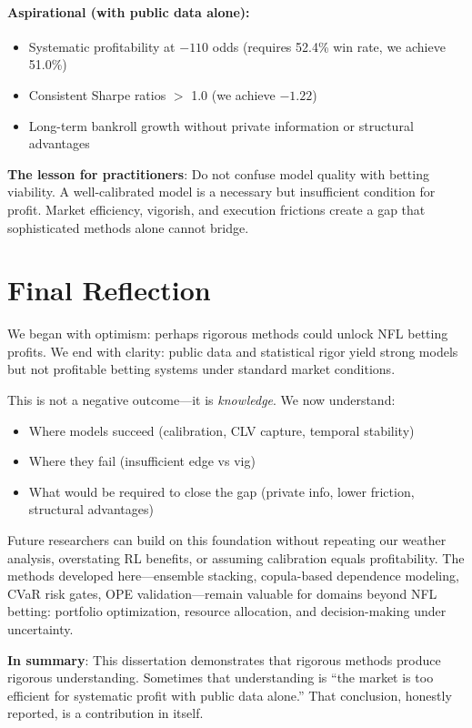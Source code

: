 \paragraph{Aspirational (with public data alone):}
\begin{itemize}
  \item Systematic profitability at $-110$ odds (requires 52.4\% win rate, we achieve 51.0\%)
  \item Consistent Sharpe ratios $>$ 1.0 (we achieve $-1.22$)
  \item Long-term bankroll growth without private information or structural advantages
\end{itemize}

\textbf{The lesson for practitioners}: Do not confuse model quality with betting viability. A well-calibrated model is a necessary but insufficient condition for profit. Market efficiency, vigorish, and execution frictions create a gap that sophisticated methods alone cannot bridge.

\section{Final Reflection}

We began with optimism: perhaps rigorous methods could unlock NFL betting profits. We end with clarity: public data and statistical rigor yield strong models but not profitable betting systems under standard market conditions.

This is not a negative outcome—it is \textit{knowledge}. We now understand:
\begin{itemize}
  \item Where models succeed (calibration, CLV capture, temporal stability)
  \item Where they fail (insufficient edge vs vig)
  \item What would be required to close the gap (private info, lower friction, structural advantages)
\end{itemize}

Future researchers can build on this foundation without repeating our weather analysis, overstating RL benefits, or assuming calibration equals profitability. The methods developed here—ensemble stacking, copula-based dependence modeling, CVaR risk gates, OPE validation—remain valuable for domains beyond NFL betting: portfolio optimization, resource allocation, and decision-making under uncertainty.

\vspace{1em}
\noindent \textbf{In summary}: This dissertation demonstrates that rigorous methods produce rigorous understanding. Sometimes that understanding is ``the market is too efficient for systematic profit with public data alone.'' That conclusion, honestly reported, is a contribution in itself.

